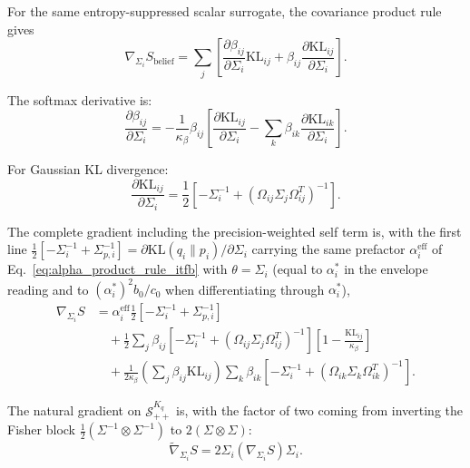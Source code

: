 \documentclass[11pt]{article}
\begin{document}
For the same entropy-suppressed scalar surrogate, the covariance product rule gives
\begin{equation}
\nabla_{\Sigma_i} S_{\mathrm{belief}} = \sum_j \left[ \frac{\partial \beta_{ij}}{\partial \Sigma_i} \mathrm{KL}_{ij} + \beta_{ij} \frac{\partial \mathrm{KL}_{ij}}{\partial \Sigma_i} \right].
\end{equation}

The softmax derivative is:
\begin{equation}
\frac{\partial \beta_{ij}}{\partial \Sigma_i} = -\frac{1}{\kappa_\beta} \beta_{ij} \left[\frac{\partial \mathrm{KL}_{ij}}{\partial \Sigma_i} - \sum_k \beta_{ik} \frac{\partial \mathrm{KL}_{ik}}{\partial \Sigma_i}\right].
\end{equation}

For Gaussian KL divergence:
\begin{equation}
\frac{\partial \mathrm{KL}_{ij}}{\partial \Sigma_i} = \frac{1}{2}\left[-\Sigma_i^{-1} + (\Omega_{ij}\Sigma_j\Omega_{ij}^T)^{-1}\right].
\end{equation}

The complete gradient including the precision-weighted self term is, with the first line $\frac{1}{2}[-\Sigma_i^{-1} + \Sigma_{p,i}^{-1}] = \partial \mathrm{KL}(q_i \| p_i)/\partial \Sigma_i$ carrying the same prefactor $\alpha_i^{\mathrm{eff}}$ of Eq.~\eqref{eq:alpha_product_rule_itfb} with $\theta = \Sigma_i$ (equal to $\alpha_i^*$ in the envelope reading and to $(\alpha_i^*)^2 b_0/c_0$ when differentiating through $\alpha_i^*$),
\begin{align}
\nabla_{\Sigma_i} S &= \alpha_i^{\mathrm{eff}}\frac{1}{2}\left[-\Sigma_i^{-1} + \Sigma_{p,i}^{-1}\right] \nonumber \\
&\quad + \frac{1}{2}\sum_j \beta_{ij} \left[-\Sigma_i^{-1} + (\Omega_{ij}\Sigma_j\Omega_{ij}^T)^{-1}\right]\left[1 - \frac{\mathrm{KL}_{ij}}{\kappa_\beta}\right] \nonumber \\
&\quad + \frac{1}{2\kappa_\beta}\left(\sum_j \beta_{ij}\mathrm{KL}_{ij}\right) \sum_k \beta_{ik} \left[-\Sigma_i^{-1} + (\Omega_{ik}\Sigma_k\Omega_{ik}^T)^{-1}\right].
\end{align}

The natural gradient on $\mathcal{S}_{++}^{K_q}$ is, with the factor of two coming from inverting the Fisher block $\tfrac{1}{2}(\Sigma^{-1}\otimes\Sigma^{-1})$ to $2(\Sigma\otimes\Sigma)$:
\begin{equation}
\tilde{\nabla}_{\Sigma_i} S = 2\Sigma_i (\nabla_{\Sigma_i} S) \Sigma_i.
\end{equation}
\end{document}
